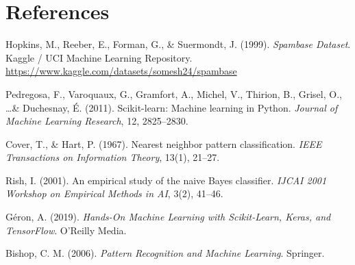 \documentclass[12pt,a4paper]{article}
\begin{document}
\section{References}
\begin{enumerate}[label={[\arabic*]}]
    \item Hopkins, M., Reeber, E., Forman, G., \& Suermondt, J. (1999). \textit{Spambase Dataset}. Kaggle / UCI Machine Learning Repository. \url{https://www.kaggle.com/datasets/somesh24/spambase}
    \item Pedregosa, F., Varoquaux, G., Gramfort, A., Michel, V., Thirion, B., Grisel, O., \dots \& Duchesnay, \'E. (2011). Scikit-learn: Machine learning in Python. \textit{Journal of Machine Learning Research}, 12, 2825--2830.
    \item Cover, T., \& Hart, P. (1967). Nearest neighbor pattern classification. \textit{IEEE Transactions on Information Theory}, 13(1), 21--27.
    \item Rish, I. (2001). An empirical study of the naive Bayes classifier. \textit{IJCAI 2001 Workshop on Empirical Methods in AI}, 3(2), 41--46.
    \item Géron, A. (2019). \textit{Hands-On Machine Learning with Scikit-Learn, Keras, and TensorFlow}. O'Reilly Media.
    \item Bishop, C. M. (2006). \textit{Pattern Recognition and Machine Learning}. Springer.
\end{enumerate}
\end{document}
